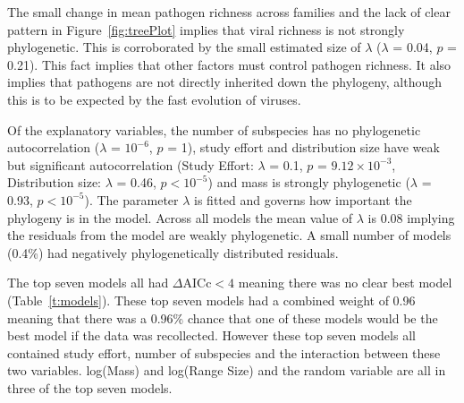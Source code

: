 The small change in mean pathogen richness across families and the lack of clear pattern in Figure~\ref{fig:treePlot} implies that viral richness is not strongly phylogenetic. 
This is corroborated by the small estimated size of $\lambda$ ($\lambda$ = 0.04, $p$ = 0.21).
This fact implies that other factors must control pathogen richness.
It also implies that pathogens are not directly inherited down the phylogeny, although this is to be expected by the fast evolution of viruses.

Of the explanatory variables, the number of subspecies has no phylogenetic autocorrelation ($\lambda$ = \ensuremath{10^{-6}}, $p$ = 1), study effort and distribution size have weak but significant autocorrelation (Study Effort: $\lambda$ = 0.1, $p$ = \ensuremath{9.12\times 10^{-3}}, Distribution size: $\lambda$ = 0.46, $p < 10^{-5}$) and mass is strongly phylogenetic ($\lambda$ = 0.93, $p < 10^{-5}$). 
The parameter $\lambda$ is fitted and governs how important the phylogeny is in the model.
Across all models the mean value of $\lambda$ is 0.08 implying the residuals from the model are weakly phylogenetic.
A small number of models (0.4\%)  had negatively phylogenetically distributed residuals.


The top seven models all had $\Delta\text{AICc} < 4$ meaning there was no clear best model (Table~\ref{t:models}).
These top seven models had a combined weight of 0.96 meaning that there was a 0.96\% chance that one of these models would be the best model if the data was recollected.
However these top seven models all contained study effort, number of subspecies and the interaction between these two variables.
log(Mass) and log(Range Size) and the random variable are all in three of the top seven models.

